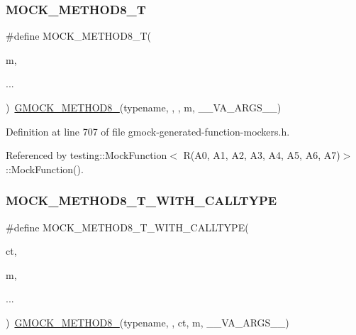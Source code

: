 \subsubsection{\texorpdfstring{M\+O\+C\+K\+\_\+\+M\+E\+T\+H\+O\+D8\+\_\+T}{MOCK\_METHOD8\_T}}
{\footnotesize\ttfamily \#define M\+O\+C\+K\+\_\+\+M\+E\+T\+H\+O\+D8\+\_\+T(\begin{DoxyParamCaption}\item[{}]{m,  }\item[{}]{... }\end{DoxyParamCaption})~\hyperlink{gmock-generated-function-mockers_8h_aa84a36427c44505207b7cad5dec7ad67}{G\+M\+O\+C\+K\+\_\+\+M\+E\+T\+H\+O\+D8\+\_\+}(typename, , , m, \+\_\+\+\_\+\+V\+A\+\_\+\+A\+R\+G\+S\+\_\+\+\_\+)}



Definition at line 707 of file gmock-\/generated-\/function-\/mockers.\+h.



Referenced by testing\+::\+Mock\+Function$<$ R(\+A0, A1, A2, A3, A4, A5, A6, A7)$>$\+::\+Mock\+Function().

\mbox{\label{gmock-generated-function-mockers_8h_a0cf1d3aba371dfe424d27b97b5473174}} 
\subsubsection{\texorpdfstring{M\+O\+C\+K\+\_\+\+M\+E\+T\+H\+O\+D8\+\_\+\+T\+\_\+\+W\+I\+T\+H\+\_\+\+C\+A\+L\+L\+T\+Y\+PE}{MOCK\_METHOD8\_T\_WITH\_CALLTYPE}}
{\footnotesize\ttfamily \#define M\+O\+C\+K\+\_\+\+M\+E\+T\+H\+O\+D8\+\_\+\+T\+\_\+\+W\+I\+T\+H\+\_\+\+C\+A\+L\+L\+T\+Y\+PE(\begin{DoxyParamCaption}\item[{}]{ct,  }\item[{}]{m,  }\item[{}]{... }\end{DoxyParamCaption})~\hyperlink{gmock-generated-function-mockers_8h_aa84a36427c44505207b7cad5dec7ad67}{G\+M\+O\+C\+K\+\_\+\+M\+E\+T\+H\+O\+D8\+\_\+}(typename, , ct, m, \+\_\+\+\_\+\+V\+A\+\_\+\+A\+R\+G\+S\+\_\+\+\_\+)}



